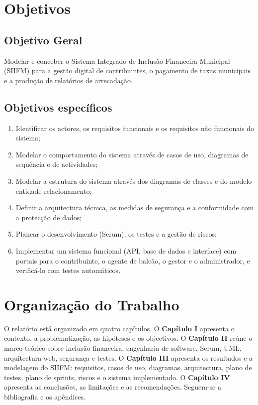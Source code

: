\documentclass[12pt,a4paper,openany]{report}
\begin{document}
\section{Objetivos}
\subsection{Objetivo Geral}
Modelar e conceber o Sistema Integrado de Inclusão Financeira Municipal (SIIFM) para a gestão digital de contribuintes, o pagamento de taxas municipais e a produção de relatórios de arrecadação.

\subsection{Objetivos específicos}
\begin{enumerate}
\item Identificar os actores, os requisitos funcionais e os requisitos não funcionais do sistema;
\item Modelar o comportamento do sistema através de casos de uso, diagramas de sequência e de actividades;
\item Modelar a estrutura do sistema através dos diagramas de classes e do modelo entidade-relacionamento;
\item Definir a arquitectura técnica, as medidas de segurança e a conformidade com a protecção de dados;
\item Planear o desenvolvimento (Scrum), os testes e a gestão de riscos;
\item Implementar um sistema funcional (API, base de dados e interface) com portais para o contribuinte, o agente de balcão, o gestor e o administrador, e verificá-lo com testes automáticos.
\end{enumerate}

\section{Organização do Trabalho}
O relatório está organizado em quatro capítulos. O \textbf{Capítulo I} apresenta o contexto, a problematização, as hipóteses e os objectivos. O \textbf{Capítulo II} reúne o marco teórico sobre inclusão financeira, engenharia de software, Scrum, UML, arquitectura web, segurança e testes. O \textbf{Capítulo III} apresenta os resultados e a modelagem do SIIFM: requisitos, casos de uso, diagramas, arquitectura, plano de testes, plano de sprints, riscos e o sistema implementado. O \textbf{Capítulo IV} apresenta as conclusões, as limitações e as recomendações. Seguem-se a bibliografia e os apêndices.
\end{document}
